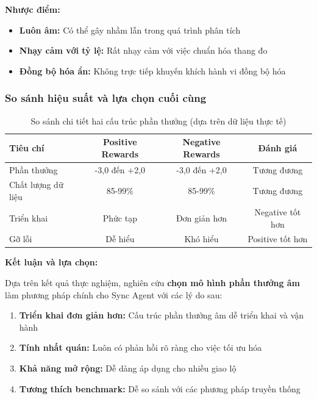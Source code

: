 \textbf{Nhược điểm:}
\begin{itemize}
    \item \textbf{Luôn âm:} Có thể gây nhầm lẫn trong quá trình phân tích

    \item \textbf{Nhạy cảm với tỷ lệ:} Rất nhạy cảm với việc chuẩn hóa thang đo

    \item \textbf{Đồng bộ hóa ẩn:} Không trực tiếp khuyến khích
        hành vi đồng bộ hóa
\end{itemize}

\subsubsection{So sánh hiệu suất và lựa chọn cuối cùng}

\begin{table}[!htp]
    \centering
    \caption{So sánh chi tiết hai cấu trúc phần thưởng (dựa trên dữ liệu thực tế)}
    \label{tab:reward_structure_comparison}
    \begin{tabular}{@{}lccc@{}}
        \toprule \textbf{Tiêu chí}  & \textbf{Positive Rewards} & \textbf{Negative Rewards} & \textbf{Đánh giá}    \\
        \midrule Phần thưởng                & -3,0 đến +2,0             & -3,0 đến +2,0             & Tương đương          \\
        Chất lượng dữ liệu                & 85-99\%                   & 85-99\%                   & Tương đương          \\
        Triển khai              & Phức tạp                  & Đơn giản hơn              & Negative tốt hơn     \\
        Gỡ lỗi                   & Dễ hiểu                   & Khó hiểu                  & Positive tốt hơn     \\
        \bottomrule
    \end{tabular}
\end{table}

\textbf{Kết luận và lựa chọn:}

Dựa trên kết quả thực nghiệm, nghiên cứu \textbf{chọn mô hình phần thưởng âm} làm phương pháp chính cho Sync Agent với các lý do sau:

\begin{enumerate}
    \item \textbf{Triển khai đơn giản hơn:} Cấu trúc phần thưởng âm dễ triển khai
        và vận hành
    \item \textbf{Tính nhất quán:} Luôn có phản hồi rõ ràng cho việc tối ưu hóa

    \item \textbf{Khả năng mở rộng:} Dễ dàng áp dụng cho nhiều giao lộ

    \item \textbf{Tương thích benchmark:} Dễ so sánh với các phương pháp
        truyền thống
\end{enumerate}

